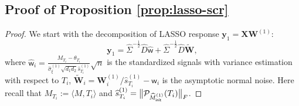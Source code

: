 \documentclass[12pt]{article}
\def\wt{\widehat}
\def\sfw{\mathsf{w}}
\def\calP{{\mathcal P}}
\newcommand{\init}{{\mathsf{init}}}
\theoremstyle{plain}
\begin{document}
\subsection{Proof of Proposition \ref{prop:lasso-scr}}
\begin{proof}
We start with the decomposition of LASSO response $\mathbf{y}_1 = \mathbf{X}\mathbf{W}^{(1)}  $:
\begin{equation*}
   \mathbf{y}_1= \widehat{\Sigma}^{-\frac{1}{2}}\widehat{D}\widehat{\sfw} + \widehat{\Sigma}^{-\frac{1}{2}}\widehat{D}\widetilde{\mathbf{W}},
\end{equation*}
where $\widehat{\sfw}_i=  \frac{M_{T_i}-\theta_{T_i}}{\widehat\sigma_\xi^{(1)} \sqrt{d_1 d_2}\widehat{s}_{T_i}^{(1)} } \sqrt{n}$ is the standardized signals with variance estimation with respect to $T_i$, $\widetilde{\mathbf{W}}_i=\mathbf{W}_i^{(1)}/\widehat s_{T_i}^{(1)} -\sfw_i $ is the asymptotic normal noise. Here recall that $M_{T_i}:=\langle M, T_i\rangle$ and $\wt s_{T_i}^{(1)}=\big\|\calP_{\wt M^{(1)}_{\init}}(T_i)\big\|_{\rm F}$. 



\end{proof}
\end{document}
